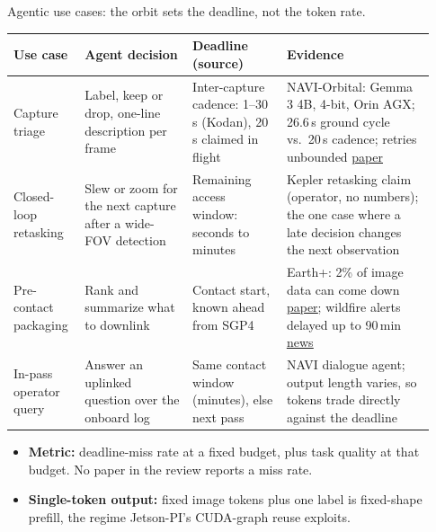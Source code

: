 \documentclass[11pt,aspectratio=43]{beamer}
\begin{document}
\begin{frame}[shrink=8]{Agentic use cases: the orbit sets the deadline, not the token rate.}

\begin{center}
\scriptsize
\raggedright
\renewcommand{\arraystretch}{1.15}
\setlength{\tabcolsep}{3pt}
\setlength{\aboverulesep}{0pt}
\setlength{\belowrulesep}{0pt}
\begin{tabular}{>{\raggedright\arraybackslash}p{0.15\linewidth}|>{\raggedright\arraybackslash}p{0.24\linewidth}|>{\raggedright\arraybackslash}p{0.21\linewidth}|>{\raggedright\arraybackslash}p{0.33\linewidth}}
\toprule
\textbf{Use case} & \textbf{Agent decision} & \textbf{Deadline (source)} & \textbf{Evidence} \\
\midrule
Capture triage & Label, keep or drop, one-line description per frame & Inter-capture cadence: 1--30\,s (Kodan), 20\,s claimed in flight & NAVI-Orbital: Gemma 3 4B, 4-bit, Orin AGX; 26.6\,s ground cycle vs.\ 20\,s cadence; retries unbounded \href{https://arxiv.org/abs/2606.18271}{\underline{paper}} \\
Closed-loop retasking & Slew or zoom for the next capture after a wide-FOV detection & Remaining access window: seconds to minutes & Kepler retasking claim (operator, no numbers); the one case where a late decision changes the next observation \\
Pre-contact packaging & Rank and summarize what to downlink & Contact start, known ahead from SGP4 & Earth+: 2\% of image data can come down \href{https://arxiv.org/abs/2403.11434}{\underline{paper}}; wildfire alerts delayed up to 90\,min \href{https://spectrum.ieee.org/nasa-ai-satellite-image-analysis}{\underline{news}} \\
In-pass operator query & Answer an uplinked question over the onboard log & Same contact window (minutes), else next pass & NAVI dialogue agent; output length varies, so tokens trade directly against the deadline \\
\bottomrule
\end{tabular}
\end{center}

\vspace{0.15cm}
\footnotesize
\begin{itemize}
  \setlength{\itemsep}{0.25em}
  \item \textbf{Metric:} deadline-miss rate at a fixed budget, plus task quality at that budget. No paper in the review reports a miss rate.
  \item \textbf{Single-token output:} fixed image tokens plus one label is fixed-shape prefill, the regime Jetson-PI's CUDA-graph reuse exploits.
\end{itemize}

\end{frame}
\end{document}
